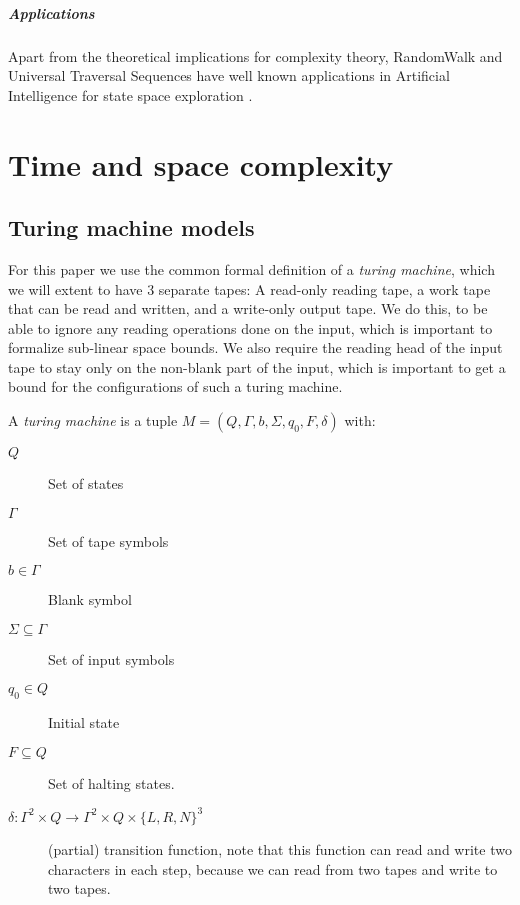 \paragraph{Applications}\label{applications}

Apart from the theoretical implications for complexity theory,
RandomWalk and Universal Traversal Sequences have well known
applications in Artificial Intelligence for state space exploration
.

\chapter{Time and space complexity}\label{time-and-space-complexity}

\section{Turing machine models}\label{turing-machine-models}

For this paper we use the common formal definition of a \emph{turing
machine}, which we will extent to have 3 separate tapes: A read-only
reading tape, a work tape that can be read and written, and a write-only
output tape. We do this, to be able to ignore any reading operations
done on the input, which is important to formalize sub-linear space
bounds. We also require the reading head of the input tape to stay only
on the non-blank part of the input, which is important to get a bound
for the configurations of such a turing machine.

A \emph{turing machine} is a tuple
$M = \left( Q, \Gamma, b, \Sigma, q_0, F, \delta \right)$ with:

\begin{description}
\item[$Q$]
Set of states
\item[$\Gamma$]
Set of tape symbols
\item[$b \in \Gamma$]
Blank symbol
\item[$\Sigma \subseteq \Gamma$]
Set of input symbols
\item[$q_0 \in Q$]
Initial state
\item[$F \subseteq Q$]
Set of halting states.
\item[$\delta : \Gamma^2 \times Q \longrightarrow \Gamma^2 \times Q \times \{L, R, N\}^3$]
(partial) transition function, note that this function can read and
write two characters in each step, because we can read from two tapes
and write to two tapes.
\end{description}

